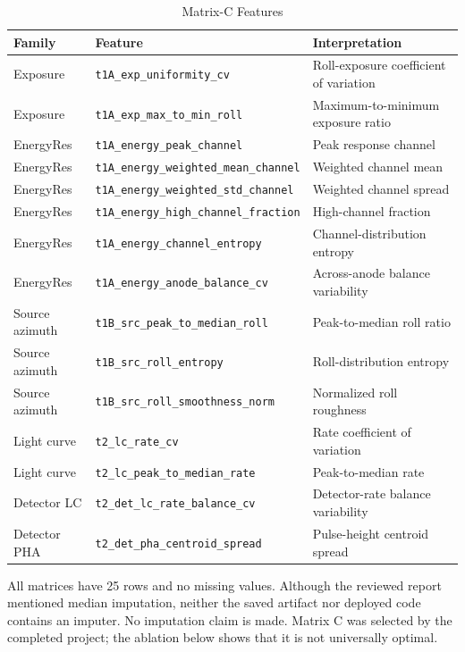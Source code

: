 \documentclass[conference]{IEEEtran}
\begin{document}
\begin{table}[t]
\caption{Matrix-C Features}
\label{tab:features}
\centering
\small
\begin{tabular}{lll}
\toprule
Family & Feature & Interpretation \\
\midrule
Exposure & \texttt{t1A\_exp\_uniformity\_cv} & Roll-exposure coefficient of variation \\
Exposure & \texttt{t1A\_exp\_max\_to\_min\_roll} & Maximum-to-minimum exposure ratio \\
EnergyRes & \texttt{t1A\_energy\_peak\_channel} & Peak response channel \\
EnergyRes & \texttt{t1A\_energy\_weighted\_mean\_channel} & Weighted channel mean \\
EnergyRes & \texttt{t1A\_energy\_weighted\_std\_channel} & Weighted channel spread \\
EnergyRes & \texttt{t1A\_energy\_high\_channel\_fraction} & High-channel fraction \\
EnergyRes & \texttt{t1A\_energy\_channel\_entropy} & Channel-distribution entropy \\
EnergyRes & \texttt{t1A\_energy\_anode\_balance\_cv} & Across-anode balance variability \\
Source azimuth & \texttt{t1B\_src\_peak\_to\_median\_roll} & Peak-to-median roll ratio \\
Source azimuth & \texttt{t1B\_src\_roll\_entropy} & Roll-distribution entropy \\
Source azimuth & \texttt{t1B\_src\_roll\_smoothness\_norm} & Normalized roll roughness \\
Light curve & \texttt{t2\_lc\_rate\_cv} & Rate coefficient of variation \\
Light curve & \texttt{t2\_lc\_peak\_to\_median\_rate} & Peak-to-median rate \\
Detector LC & \texttt{t2\_det\_lc\_rate\_balance\_cv} & Detector-rate balance variability \\
Detector PHA & \texttt{t2\_det\_pha\_centroid\_spread} & Pulse-height centroid spread \\
\bottomrule
\end{tabular}
\end{table}

All matrices have 25 rows and no missing values. Although the reviewed report mentioned median imputation, neither the saved artifact nor deployed code contains an imputer. No imputation claim is made. Matrix C was selected by the completed project; the ablation below shows that it is not universally optimal.
\end{document}
